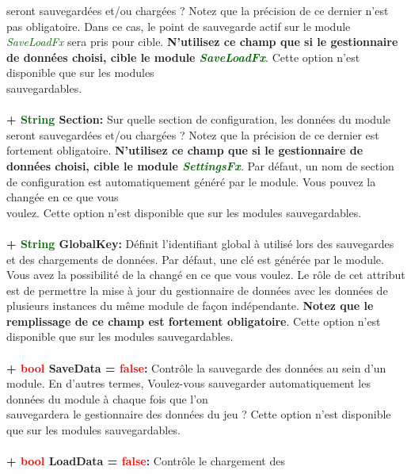 \documentclass[a4paper, 11pt]{article}
\begin{document}
	seront sauvegardées et/ou chargées ? Notez que la précision de ce dernier n'est pas obligatoire. Dans ce 
	cas, le point de sauvegarde actif sur le module \textit{\textcolor{darkgreen}{SaveLoadFx}} sera pris 
	pour cible. \textbf{N'utilisez ce champ que si le gestionnaire de données choisi, cible le module 
	\textit{\textcolor{darkgreen}{SaveLoadFx}}}. Cette option n'est disponible que sur les modules
	\\sauvegardables.\\\\
	\textbf{+ \textcolor{darkgreen}{String} Section:} Sur quelle section de configuration, les données du 
	module seront sauvegardées et/ou chargées ? Notez que la précision de ce dernier est fortement
	obligatoire. \textbf{N'utilisez ce champ que si le gestionnaire de données choisi, cible le module 
	\textit{\textcolor{darkgreen}{SettingsFx}}}. Par défaut, un nom de section de configuration est
	automatiquement généré par le module. Vous pouvez la changée en ce que vous \\voulez. Cette option n'est 
	disponible que sur les modules sauvegardables.\\\\
	\textbf{+ \textcolor{darkgreen}{String} GlobalKey:} Définit l'identifiant global à utilisé lors des 
	sauvegardes et des chargements de données. Par défaut, une clé est générée par le module. Vous avez la 
	possibilité de la changé en ce que vous voulez. Le rôle de cet attribut est de permettre la mise à jour 
	du gestionnaire de données avec les données de plusieurs instances du même module de façon indépendante. 
	\textbf{Notez que le remplissage de ce champ est fortement obligatoire}. Cette option n'est disponible 
	que sur les modules sauvegardables.\\\\
	\textbf{+ \textcolor{red}{bool} SaveData = \textcolor{red}{false}:} Contrôle la sauvegarde des données
	au sein d'un module. En d'autres termes, Voulez-vous sauvegarder automatiquement les données du module à
	chaque fois que l'on \\sauvegardera le gestionnaire des données du jeu ? Cette option n'est disponible 
	que sur les modules sauvegardables.\\\\
	\newpage \textbf{+ \textcolor{red}{bool} LoadData = \textcolor{red}{false}:} Contrôle le chargement des
\end{document}
